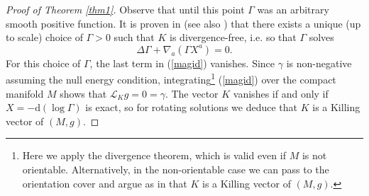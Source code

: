 \documentclass[11pt, reqno]{amsart}
\theoremstyle{plain}
\theoremstyle{definition}
\numberwithin{equation}{section}
\begin{document}
\begin{proof}[Proof of Theorem \ref{thm1}]
Observe that until this point $\Gamma$ was an arbitrary smooth positive function. It is proven in \cite{DL} (see also \cite{G84, AMS08, LR12}) that there exists a unique (up to scale) choice of $\Gamma > 0$ such that $K$ is divergence-free, i.e. so that $\Gamma$ solves
\begin{equation} \label{gammadef}
    \Delta \Gamma  +\nabla_a(\Gamma X^a) = 0.
\end{equation}
For this choice of $\Gamma$, the last term in (\ref{magid}) vanishes. Since $\gamma$ is non-negative assuming the null energy condition, integrating\footnote{Here we apply the divergence theorem, which is valid even if $M$ is not orientable. Alternatively, in the non-orientable case we can pass to the orientation cover and argue as in \cite{DL} that $K$ is a Killing vector of $(M,g)$.} (\ref{magid}) over the compact manifold $M$ shows that $\mathcal{L}_K g = 0 = \gamma$. The vector $K$ vanishes if and only if $X = -\text{d}(\log \Gamma)$ is exact, so for rotating solutions we deduce that $K$ is a Killing vector of $(M,g)$.


\end{proof}
\end{document}

